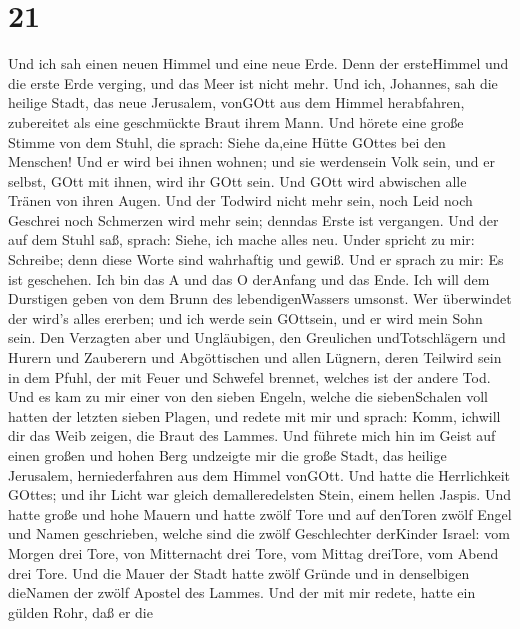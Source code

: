 \hypertarget{section-19}{%
\section{21}\label{section-19}}

 Und ich sah einen neuen Himmel und eine neue Erde. Denn der
ersteHimmel und die erste Erde verging, und das Meer ist nicht mehr.
 Und ich, Johannes, sah die heilige Stadt, das neue
Jerusalem, vonGOtt aus dem Himmel herabfahren, zubereitet als eine
geschmückte Braut ihrem Mann.  Und hörete eine große Stimme
von dem Stuhl, die sprach: Siehe da,eine Hütte GOttes bei den Menschen!
Und er wird bei ihnen wohnen; und sie werdensein Volk sein, und er
selbst, GOtt mit ihnen, wird ihr GOtt sein.  Und GOtt wird
abwischen alle Tränen von ihren Augen. Und der Todwird nicht mehr sein,
noch Leid noch Geschrei noch Schmerzen wird mehr sein; denndas Erste ist
vergangen.  Und der auf dem Stuhl saß, sprach: Siehe, ich
mache alles neu. Under spricht zu mir: Schreibe; denn diese Worte sind
wahrhaftig und gewiß.  Und er sprach zu mir: Es ist
geschehen. Ich bin das A und das O derAnfang und das Ende. Ich will dem
Durstigen geben von dem Brunn des lebendigenWassers umsonst.
 Wer überwindet der wird's alles ererben; und ich werde sein
GOttsein, und er wird mein Sohn sein.  Den Verzagten aber
und Ungläubigen, den Greulichen undTotschlägern und Hurern und Zauberern
und Abgöttischen und allen Lügnern, deren Teilwird sein in dem Pfuhl,
der mit Feuer und Schwefel brennet, welches ist der andere Tod.
 Und es kam zu mir einer von den sieben Engeln, welche die
siebenSchalen voll hatten der letzten sieben Plagen, und redete mit mir
und sprach: Komm, ichwill dir das Weib zeigen, die Braut des Lammes.
 Und führete mich hin im Geist auf einen großen und hohen
Berg undzeigte mir die große Stadt, das heilige Jerusalem,
herniederfahren aus dem Himmel vonGOtt.  Und hatte die
Herrlichkeit GOttes; und ihr Licht war gleich demalleredelsten Stein,
einem hellen Jaspis.  Und hatte große und hohe Mauern und
hatte zwölf Tore und auf denToren zwölf Engel und Namen geschrieben,
welche sind die zwölf Geschlechter derKinder Israel:  vom
Morgen drei Tore, von Mitternacht drei Tore, vom Mittag dreiTore, vom
Abend drei Tore.  Und die Mauer der Stadt hatte zwölf
Gründe und in denselbigen dieNamen der zwölf Apostel des Lammes.
 Und der mit mir redete, hatte ein gülden Rohr, daß er die
